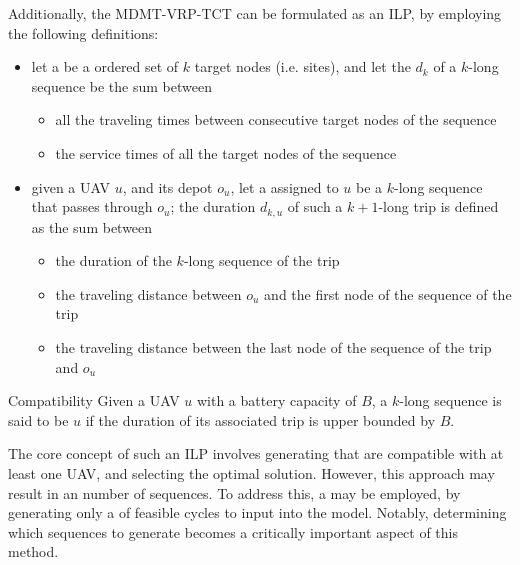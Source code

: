 \documentclass[a4paper, 12pt]{report}
\begin{document}

    Additionally, the MDMT-VRP-TCT can be formulated as an ILP, by employing the following definitions:

    \begin{itemize}
        \item let a  be a ordered set of $k$ target nodes (i.e. sites), and let the  $d_k$ of a $k$-long sequence be the sum between
            \begin{itemize}
                \item all the traveling times between consecutive target nodes of the sequence
                \item the service times of all the target nodes of the sequence
            \end{itemize}
        \item given a UAV $u$, and its depot $o_u$, let a  assigned to $u$ be a $k$-long sequence that passes through $o_u$; the duration $d_{k,u}$ of such a $k + 1$-long trip is defined as the sum between
            \begin{itemize}
                \item the duration of the $k$-long sequence of the trip
                \item the traveling distance between $o_u$ and the first node of the sequence of the trip
                \item the traveling distance between the last node of the sequence of the trip and $o_u$
            \end{itemize}
    \end{itemize}

    \begin{frameddefn}{Compatibility}
        Given a UAV $u$ with a battery capacity of $B$, a $k$-long sequence is said to be  $u$ if the duration of its associated trip is upper bounded by $B$.
    \end{frameddefn}

    The core concept of such an ILP involves generating  that are compatible with at least one UAV, and selecting the optimal solution. However, this approach may result in an  number of sequences. To address this, a  may be employed, by generating only a  of feasible cycles to input into the model. Notably, determining which sequences to generate becomes a critically important aspect of this method.
\end{document}
